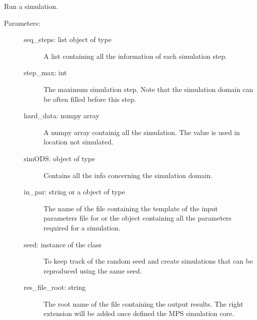 \documentclass[letterpaper,10pt,english]{sphinxmanual}
\begin{document}

\begin{fulllineitems}
\label{\detokenize{appendices:s2Dcd.s2Dcd.sim_run}}
Run a  simulation.
\begin{description}
\item[{Parameters:}] \leavevmode\begin{description}
\item[{seq\_steps: list object of type {\hyperref[\detokenize{appendices:s2Dcd.s2Dcd.SeqStep}]{}}}] \leavevmode
A list containing all the information of each simulation step.

\item[{step\_max: int}] \leavevmode
The maximum simulation step. Note that the simulation
domain can be often filled before this step.

\item[{hard\_data: numpy array}] \leavevmode
A numpy array containig all the simulation. The value
 is used in location not simulated.

\item[{simODS: object of type }] \leavevmode
Contains all the info concerning the simulation domain.

\item[{in\_par: string or a object of type }] \leavevmode
The name of the file containing the template of the input
parameters file for  or the object containing all
the parameters required for a  simulation.

\item[{seed: instance of the class }] \leavevmode
To keep track of the random seed and create simulations
that can be reproduced using the same seed.

\item[{res\_file\_root: string}] \leavevmode
The root name of the file containing the output
results. The right extension will be added once defined
the MPS simulation core.


\end{description}
\end{description}
\end{fulllineitems}
\end{document}
